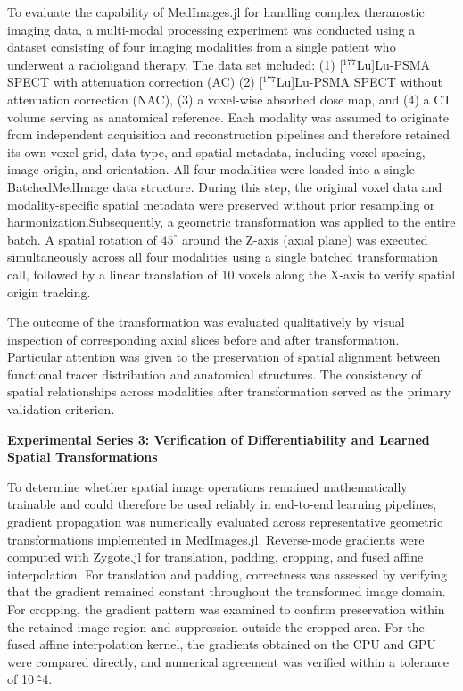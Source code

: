 \documentclass[a4paper,10pt]{elsarticle}
\begin{document}
To evaluate the capability of MedImages.jl for handling complex theranostic imaging data, a multi-modal processing experiment was conducted using a dataset consisting of four imaging modalities from a single patient who underwent a radioligand therapy. The data set included: (1) [$^{177}$Lu]Lu-PSMA SPECT with attenuation correction (AC) (2) [$^{177}$Lu]Lu-PSMA SPECT without attenuation correction (NAC), (3) a voxel-wise absorbed dose map, and (4) a CT volume serving as anatomical reference. Each modality was assumed to originate from independent acquisition and reconstruction pipelines and therefore retained its own voxel grid, data type, and spatial metadata, including voxel spacing, image origin, and orientation.
All four modalities were loaded into a single BatchedMedImage data structure. During this step, the original voxel data and modality-specific spatial metadata were preserved without prior resampling or harmonization.Subsequently, a geometric transformation was applied to the entire batch. A spatial rotation of $45^{\circ}$ around the Z-axis (axial plane) was executed simultaneously across all four modalities using a single batched transformation call, followed by a linear translation of 10 voxels along the X-axis to verify spatial origin tracking.

The outcome of the transformation was evaluated qualitatively by visual inspection of corresponding axial slices before and after transformation. Particular attention was given to the preservation of spatial alignment between functional tracer distribution and anatomical structures. The consistency of spatial relationships across modalities after transformation served as the primary validation criterion. 


\textbf{Experimental Series 3: Verification of Differentiability and Learned Spatial Transformations}

To determine whether spatial image operations remained mathematically trainable and could therefore be used reliably in end-to-end learning pipelines, gradient propagation was numerically evaluated across representative geometric transformations implemented in MedImages.jl. Reverse-mode gradients were computed with Zygote.jl for translation, padding, cropping, and fused affine interpolation. For translation and padding, correctness was assessed by verifying that the gradient remained constant throughout the transformed image domain. For cropping, the gradient pattern was examined to confirm preservation within the retained image region and suppression outside the cropped area. For the fused affine interpolation kernel, the gradients obtained on the CPU and GPU were compared directly, and numerical agreement was verified within a tolerance of 10 \^ -4. 
\end{document}
